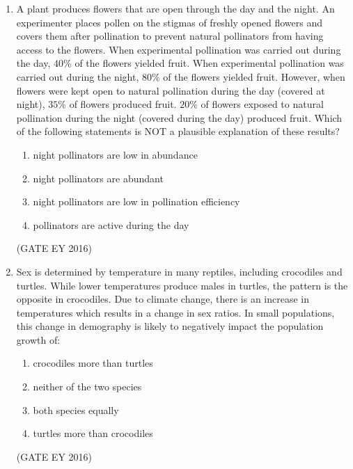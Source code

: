 \documentclass[journal]{IEEEtran}
\begin{document}
\begin{enumerate}[label=Q.\arabic*.]
\item A plant produces flowers that are open through the day and the night. An experimenter places pollen on the stigmas of freshly opened flowers and covers them after pollination to prevent natural pollinators from having access to the flowers. When experimental pollination was carried out during the day, $40$\% of the flowers yielded fruit. When experimental pollination was carried out during the night, $80$\% of the flowers yielded fruit. However, when flowers were kept open to natural pollination during the day (covered at night), $35$\% of flowers produced fruit. $20$\% of flowers exposed to natural pollination during the night (covered during the day) produced fruit. Which of the following statements is NOT a plausible explanation of these results?
\begin{enumerate}
    \item night pollinators are low in abundance
    \item night pollinators are abundant
    \item night pollinators are low in pollination efficiency
    \item pollinators are active during the day
\end{enumerate}
\hfill{(GATE EY 2016)}

\item Sex is determined by temperature in many reptiles, including crocodiles and turtles. While lower temperatures produce males in turtles, the pattern is the opposite in crocodiles. Due to climate change, there is an increase in temperatures which results in a change in sex ratios. In small populations, this change in demography is likely to negatively impact the population growth of:
\begin{enumerate}
    \item crocodiles more than turtles
    \item neither of the two species
    \item both species equally
    \item turtles more than crocodiles
\end{enumerate}
\hfill{(GATE EY 2016)}


\end{enumerate}
\end{document}
